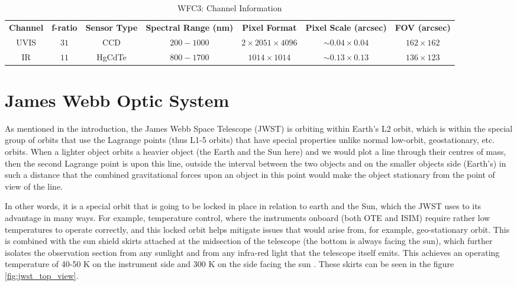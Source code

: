 \begin{table}
    \centering
    \small
    \begin{tabular}{ccccccc}
        \textbf{Channel} & \textbf{f-ratio} & \textbf{Sensor Type} & \textbf{Spectral Range (nm)} & \textbf{Pixel Format} & \textbf{Pixel Scale (arcsec)} & \textbf{FOV (arcsec)}\\
        UVIS & $31$ & CCD & $200-1000$ & $2 \times 2051 \times 4096$ & $\sim 0.04 \times 0.04$ & $162 \times 162$ \\
        IR & $11$ & HgCdTe & $800-1700$ & $1014 \times 1014$ & $\sim 0.13 \times 0.13$ & $136 \times 123$ \\
    \end{tabular}
    \caption{WFC3: Channel Information \cite{HST_WFC3}}
    \label{tab:wfc3_channel_information}
\end{table}

\section{James Webb Optic System}

As mentioned in the introduction, the James Webb Space Telescope (JWST) is orbiting within Earth's L2 orbit, which is within the special group of orbits that use the Lagrange points (thus L1-5 orbits) that have special properties unlike normal low-orbit, geostationary, etc. orbits. When a lighter object orbits a heavier object (the Earth and the Sun here) and we would plot a line through their centres of mass, then the second Lagrange point is upon this line, outside the interval between the two objects and on the smaller objects side (Earth's) in such a distance that the combined gravitational forces upon an object in this point would make the object stationary from the point of view of the line\cite{JWST_Orbit}.

In other words, it is a special orbit that is going to be locked in place in relation to earth and the Sun, which the JWST uses to its advantage in many ways. For example, temperature control, where the instruments onboard (both OTE and ISIM) require rather low temperatures to operate correctly, and this locked orbit helps mitigate issues that would arise from, for example, geo-stationary orbit. This is combined with the sun shield skirts attached at the midsection of the telescope (the bottom is always facing the sun), which further isolates the observation section from any sunlight and from any infra-red light that the telescope itself emits. This achieves an operating temperature of 40-50 K on the instrument side and 300 K on the side facing the sun \cite{JWST_Observatory_Article}. These skirts can be seen in the figure \ref{fig:jwst_top_view}.

